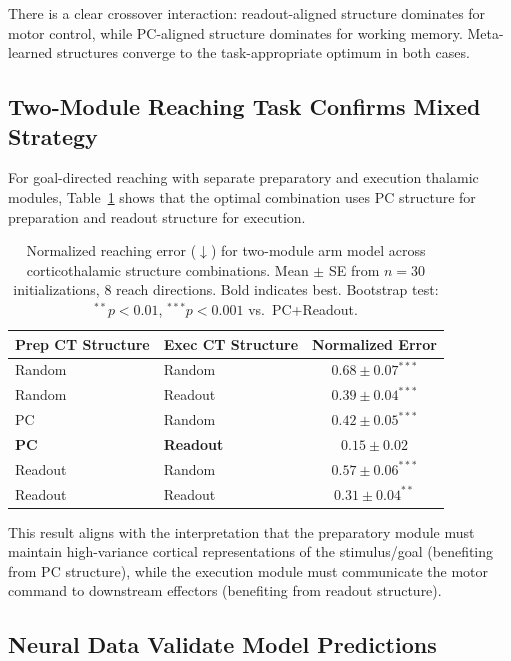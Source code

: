 \documentclass[11pt]{article}
\begin{document}
There is a clear crossover interaction: readout-aligned structure dominates for motor control, while PC-aligned structure dominates for working memory. Meta-learned structures converge to the task-appropriate optimum in both cases.

\subsection{Two-Module Reaching Task Confirms Mixed Strategy}

For goal-directed reaching with separate preparatory and execution thalamic modules, Table~\ref{tab:reaching} shows that the optimal combination uses PC structure for preparation and readout structure for execution.

\begin{table}[H]
\centering
\caption{Normalized reaching error ($\downarrow$) for two-module arm model across corticothalamic structure combinations. Mean $\pm$ SE from $n = 30$ initializations, 8 reach directions. Bold indicates best. Bootstrap test: $^{**}p<0.01$, $^{***}p<0.001$ vs.\ PC+Readout.}
\label{tab:reaching}
\begin{tabular}{llc}
\toprule
Prep CT Structure & Exec CT Structure & Normalized Error \\
\midrule
Random & Random & $0.68 \pm 0.07^{***}$ \\
Random & Readout & $0.39 \pm 0.04^{***}$ \\
PC & Random & $0.42 \pm 0.05^{***}$ \\
\textbf{PC} & \textbf{Readout} & $\mathbf{0.15 \pm 0.02}$ \\
Readout & Random & $0.57 \pm 0.06^{***}$ \\
Readout & Readout & $0.31 \pm 0.04^{**}$ \\
\bottomrule
\end{tabular}
\end{table}

This result aligns with the interpretation that the preparatory module must maintain high-variance cortical representations of the stimulus/goal (benefiting from PC structure), while the execution module must communicate the motor command to downstream effectors (benefiting from readout structure).

\subsection{Neural Data Validate Model Predictions}
\end{document}
